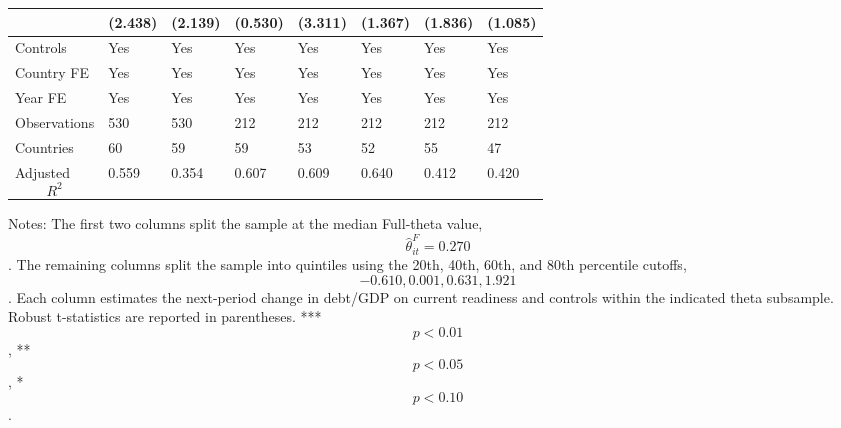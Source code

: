 \begin{table}[H]
\begin{threeparttable}
\begin{tabularx}{\textwidth}{lYYYYYYY}
  & (2.438) & (2.139) & (0.530) & (3.311) & (1.367) & (1.836) & (1.085) \\
\midrule
Controls & Yes & Yes & Yes & Yes & Yes & Yes & Yes \\
Country FE & Yes & Yes & Yes & Yes & Yes & Yes & Yes \\
Year FE & Yes & Yes & Yes & Yes & Yes & Yes & Yes \\
Observations & 530 & 530 & 212 & 212 & 212 & 212 & 212 \\
Countries & 60 & 59 & 59 & 53 & 52 & 55 & 47 \\
Adjusted $$R^2$$ & 0.559 & 0.354 & 0.607 & 0.609 & 0.640 & 0.412 & 0.420 \\
\bottomrule
\end{tabularx}
\begin{tablenotes}[flushleft]\footnotesize
\item Notes: The first two columns split the sample at the median Full-theta value, $$\widehat{\theta}^{F}_{it}=0.270$$. The remaining columns split the sample into quintiles using the 20th, 40th, 60th, and 80th percentile cutoffs, $$-0.610, 0.001, 0.631, 1.921$$. Each column estimates the next-period change in debt/GDP on current readiness and controls within the indicated theta subsample. Robust t-statistics are reported in parentheses. *** $$p<0.01$$, ** $$p<0.05$$, * $$p<0.10$$.
\end{tablenotes}
\end{threeparttable}
\end{table}
